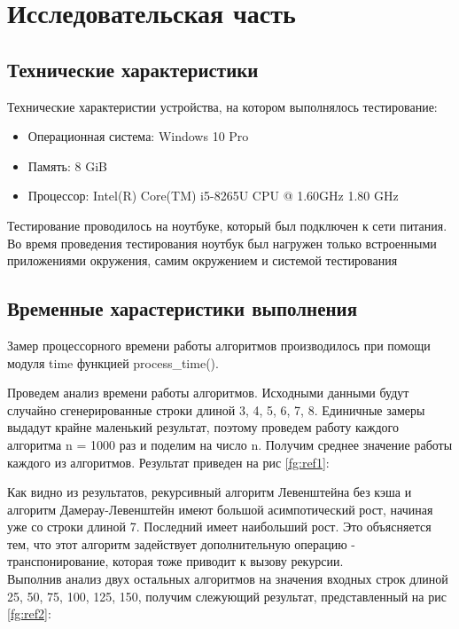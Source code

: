 \chapter{Исследовательская часть}
\section{Технические характеристики}
Технические характеристии устройства, на котором выполнялось тестирование:
\begin{itemize}
	\item Операционная система: Windows 10 Pro
	\item Память: 8 GiB
	\item Процессор: Intel(R) Core(TM) i5-8265U CPU @ 1.60GHz   1.80 GHz
\end{itemize}
Тестирование проводилось на ноутбуке, который был подключен к сети питания. Во время проведения тестирования ноутбук был нагружен только встроенными приложениями окружения, самим окружением и системой тестирования

\section{Временные харастеристики выполнения}
Замер процессорного времени работы алгоритмов производилось при помощи модуля time функцией process\_time().

Проведем анализ времени работы алгоритмов. Исходными данными будут случайно сгенерированные строки длиной {3, 4, 5, 6, 7, 8}. Единичные замеры выдадут крайне маленький результат, поэтому  проведем работу каждого алгоритма n = 1000 раз и поделим на число n. Получим среднее значение работы каждого из алгоритмов. Результат приведен на рис \ref{fg:ref1}:

\begin{figure}[ht!]
\end{figure} 

Как видно из результатов, рекурсивный алгоритм Левенштейна без кэша и алгоритм Дамерау-Левенштейн имеют большой асимпотический рост, начиная уже со строки длиной 7. Последний имеет наибольший рост. Это объясняется тем, что этот алгоритм задействует дополнительную операцию - транспонирование, которая тоже приводит к вызову рекурсии. \\
Выполнив анализ двух остальных алгоритмов на значения входных строк длиной {25, 50, 75, 100, 125, 150}, получим слежующий результат, представленный на рис \ref{fg:ref2}:
\begin{figure}[ht!]
\end{figure} 

